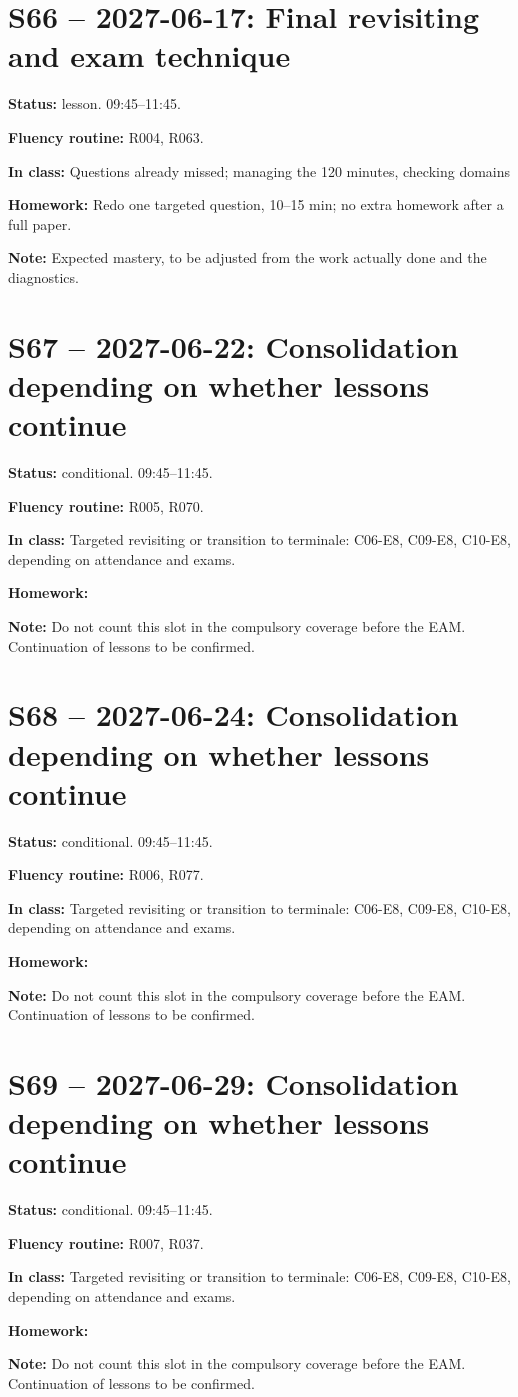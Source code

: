 \section*{S66 -- 2027-06-17: Final revisiting and exam technique}
\textbf{Status:} lesson. 09:45–11:45.\par\textbf{Fluency routine:} R004, R063.\par\textbf{In class:} Questions already missed; managing the 120 minutes, checking domains\par\textbf{Homework:} Redo one targeted question, 10–15 min; no extra homework after a full paper.\par\textbf{Note:} Expected mastery, to be adjusted from the work actually done and the diagnostics.
\section*{S67 -- 2027-06-22: Consolidation depending on whether lessons continue}
\textbf{Status:} conditional. 09:45–11:45.\par\textbf{Fluency routine:} R005, R070.\par\textbf{In class:} Targeted revisiting or transition to terminale: C06-E8, C09-E8, C10-E8, depending on attendance and exams.\par\textbf{Homework:} \par\textbf{Note:} Do not count this slot in the compulsory coverage before the EAM. Continuation of lessons to be confirmed.
\section*{S68 -- 2027-06-24: Consolidation depending on whether lessons continue}
\textbf{Status:} conditional. 09:45–11:45.\par\textbf{Fluency routine:} R006, R077.\par\textbf{In class:} Targeted revisiting or transition to terminale: C06-E8, C09-E8, C10-E8, depending on attendance and exams.\par\textbf{Homework:} \par\textbf{Note:} Do not count this slot in the compulsory coverage before the EAM. Continuation of lessons to be confirmed.
\section*{S69 -- 2027-06-29: Consolidation depending on whether lessons continue}
\textbf{Status:} conditional. 09:45–11:45.\par\textbf{Fluency routine:} R007, R037.\par\textbf{In class:} Targeted revisiting or transition to terminale: C06-E8, C09-E8, C10-E8, depending on attendance and exams.\par\textbf{Homework:} \par\textbf{Note:} Do not count this slot in the compulsory coverage before the EAM. Continuation of lessons to be confirmed.
